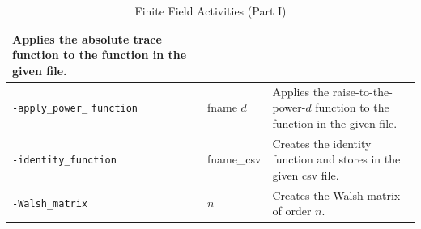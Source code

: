 \begin{table}
\begin{center}
\begin{tabular}{|p{4cm}|p{3cm}|p{7cm}|}
		Applies the absolute trace function to the function in the given file. \\
		\hline
		\verb'-apply_power_' \verb'function' & fname $d$  &  
		Applies the raise-to-the-power-$d$ function to the function in the given file. \\
		\hline
		\verb'-identity_function' & fname\_csv   &  
		Creates the identity function and stores in the given csv file. \\
		\hline
		\verb'-Walsh_matrix' & $n$  &  Creates the Walsh matrix of order $n$. \\
		\hline
		\end{tabular}
	\end{center}
	\caption{\label{tab:finite:field:activities:A}Finite Field Activities (Part I)}
\end{table}
		
